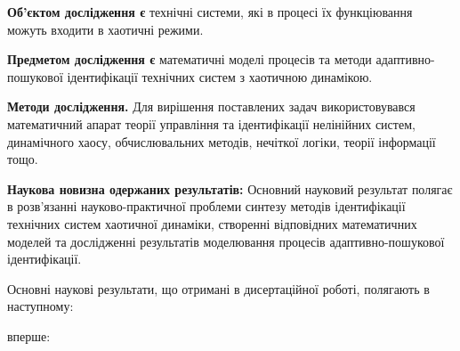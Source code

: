 \documentclass[a4paper,13pt]{atuaref}
\begin{document}
\textbf{Об'єктом дослідження є}
технічні системи, які в процесі їх функціювання можуть
входити в хаотичні режими.

\smallskip
\textbf{Предметом дослідження є}
математичні моделі процесів та методи
адаптивно-пошукової ідентифікації технічних систем з хаотичною динамікою.

\smallskip
\textbf{Методи дослідження.}
Для вирішення поставлених задач використовувався математичний апарат
теорії управління та ідентифікації нелінійних систем, динамічного хаосу,
обчислювальних методів, нечіткої логіки, теорії інформації тощо.

\smallskip
\textbf{Наукова новизна одержаних результатів:}
Основний науковий результат полягає в розв'язанні науково-практичної проблеми
синтезу методів ідентифікації
технічних систем хаотичної динаміки, створенні відповідних математичних
моделей та дослідженні результатів моделювання процесів
адаптивно-пошукової ідентифікації.

Основні наукові результати, що отримані в дисертаційної роботі, полягають
в наступному:

\noindent
вперше:
\end{document}

